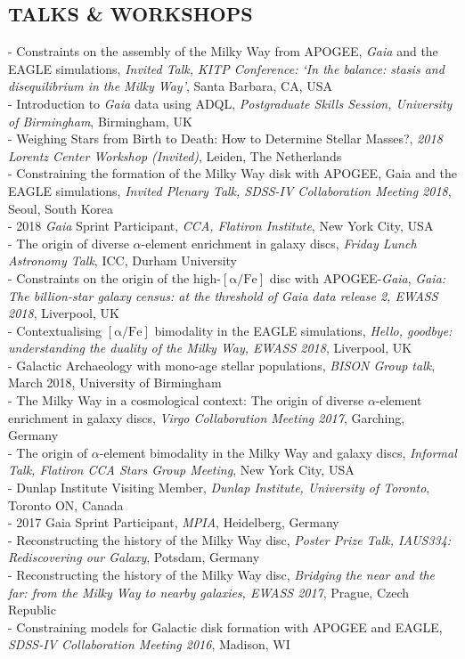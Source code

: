 \documentclass[margin]{res}
\begin{document}
\begin{resume}
\section{TALKS \& WORKSHOPS}
- Constraints on the assembly of the Milky Way from APOGEE, \emph{Gaia} and the EAGLE simulations, \emph{Invited Talk, KITP Conference: `In the balance: stasis and disequilibrium in the Milky Way'}, Santa Barbara, CA, USA\\ 
- Introduction to \emph{Gaia} data using ADQL, \emph{Postgraduate Skills Session, University of Birmingham}, Birmingham, UK\\
- Weighing Stars from Birth to Death: How to Determine Stellar Masses?, \emph{2018 Lorentz Center Workshop (Invited)}, Leiden, The Netherlands\\
- Constraining the formation of the Milky Way disk with APOGEE, Gaia and the EAGLE simulations, \emph{Invited Plenary Talk, SDSS-IV Collaboration Meeting 2018}, Seoul, South Korea\\
- 2018 \emph{Gaia} Sprint Participant, \emph{CCA, Flatiron Institute}, New York City, USA\\
- The origin of diverse $\alpha$-element enrichment in galaxy discs, \emph{Friday Lunch Astronomy Talk}, ICC, Durham University\\
- Constraints on the origin of the high-$\mathrm{[\alpha/Fe]}$ disc with APOGEE-\emph{Gaia}, \emph{Gaia: The billion-star galaxy census: at the threshold of Gaia data release 2, EWASS 2018}, Liverpool, UK \\
- Contextualising $\mathrm{[\alpha/Fe]}$ bimodality in the EAGLE simulations, \emph{Hello, goodbye: understanding the duality of the Milky Way, EWASS 2018}, Liverpool, UK \\
- Galactic Archaeology with mono-age stellar populations, \emph{BISON Group talk}, March 2018, University of Birmingham\\
- The Milky Way in a cosmological context: The origin of diverse $\alpha$-element enrichment in galaxy discs, \emph{Virgo Collaboration Meeting 2017}, Garching, Germany\\
- The origin of $\alpha$-element bimodality in the Milky Way and galaxy discs, \emph{Informal Talk, Flatiron CCA Stars Group Meeting}, New York City, USA\\
- Dunlap Institute Visiting Member, \emph{Dunlap Institute, University of Toronto}, Toronto ON, Canada\\
- 2017 Gaia Sprint Participant, \emph{MPIA}, Heidelberg, Germany\\
- Reconstructing the history of the Milky Way disc, \emph{Poster Prize Talk, IAUS334: Rediscovering our Galaxy}, Potsdam, Germany\\
- Reconstructing the history of the Milky Way disc, \emph{Bridging the near and the far: from the Milky Way to nearby galaxies, EWASS 2017}, Prague, Czech Republic\\
- Constraining models for Galactic disk formation with APOGEE and EAGLE, \emph{SDSS-IV Collaboration Meeting 2016}, Madison, WI\\




\end{resume}
\end{document}
